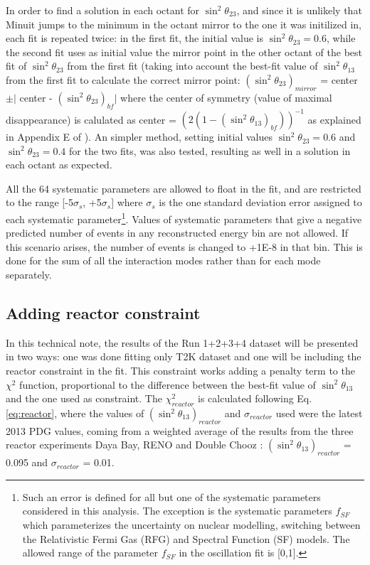 In order to find a solution in each octant for $\sin^{2}\theta_{23}$, and since it is unlikely that Minuit jumps to the minimum
in the octant mirror to the one it was initilized in, each fit is repeated twice:
in the first fit, the initial value is $\sin^{2}\theta_{23} = 0.6$, while the second fit uses as initial value the mirror point in the other octant of the best fit of $\sin^{2}\theta_{23}$ from the first fit (taking into account the best-fit value of  $\sin^{2}\theta_{13}$ from the first fit to calculate the correct mirror point: $(\sin^{2}\theta_{23})_{mirror}$ = center $\pm |$ center - $(\sin^{2}\theta_{23})_{bf}|$ where the center of symmetry (value of maximal disappearance) is calulated as
center = $(2(1-(\sin^{2}\theta_{13})_{bf}))^{-1}$ as explained in Appendix E of \cite{OurJointAnalysis}). 
An simpler method, setting initial values $\sin^{2}\theta_{23} = 0.6$ and $\sin^{2}\theta_{23} = 0.4$ for the two fits,
 was also tested, resulting as well in a solution in each octant as expected.

All the 64 systematic parameters are allowed to float in the fit, and are restricted to the range [-5$\sigma_{s}$, +5$\sigma_{s}$]
where $\sigma_{s}$ is the one standard deviation error assigned to each systematic parameter\footnote{
 Such an error is defined for all but one of the systematic parameters considered in this analysis. 
 The exception is the systematic parameters $f_{SF}$ which parameterizes the uncertainty on nuclear modelling,
 switching between the Relativistic Fermi Gas (RFG) and Spectral Function (SF) models. The allowed range of the parameter $f_{SF}$ 
 in the oscillation fit is [0,1].}.
Values of systematic parameters that give a negative predicted number of events in any reconstructed energy bin are not allowed. 
If this scenario arises, the number of events is changed to +1E-8 in that bin. This is done for the sum of all the interaction 
modes rather than for each mode separately.

%

\subsection{Adding reactor constraint}
\label{sec:reactor_constraint}

In this technical note, the results of the Run 1+2+3+4 dataset  will be presented in two ways: one was done fitting 
only T2K dataset and one will be including the reactor constraint in the fit.
This constraint works adding a penalty term to the $\chi^2$ function, proportional to the difference
between the best-fit value of $\sin^{2}\theta_{13}$ and the one used as constraint. 
The $\chi^2_{reactor}$ is calculated following Eq. \ref{eq:reactor}, where the values of 
$(\sin^{2}\theta_{13})_{reactor}$ and $\sigma_{reactor}$ used were the latest 2013 PDG values, 
coming from a weighted average of the results from the three reactor experiments Daya Bay, RENO and Double Chooz \cite{PDG2013}:
$(\sin^{2}\theta_{13})_{reactor}$ = 0.095 and $\sigma_{reactor}$ = 0.01.

